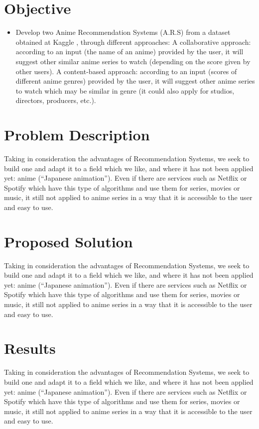 \documentclass[conference]{IEEEtran}
\begin{document}
\section{Objective}
\begin{itemize}
	\item Develop two Anime Recommendation Systems (A.R.S) from a dataset obtained at Kaggle \cite{b7}, through different approaches:
	\SubItem A collaborative approach: according to an input (the name of an anime) provided by the user, it will suggest other similar anime series to watch (depending on the score given by other users).
	\SubItem A content-based approach: according to an input (scores of different anime genres) provided by the user, it will suggest other anime series to watch which may be similar in genre (it could also apply for studios, directors, producers, etc.).
\end{itemize}

\section{Problem Description}

Taking in consideration the advantages of Recommendation Systems, we seek to build one and adapt it to a field which we like, and where it has not been applied yet: anime (“Japanese animation”). Even if there are services such as Netflix or Spotify which have this type of algorithms and use them for series, movies or music, it still not applied to anime series in a way that it is accessible to the user and easy to use.

\section{Proposed Solution}

Taking in consideration the advantages of Recommendation Systems, we seek to build one and adapt it to a field which we like, and where it has not been applied yet: anime (“Japanese animation”). Even if there are services such as Netflix or Spotify which have this type of algorithms and use them for series, movies or music, it still not applied to anime series in a way that it is accessible to the user and easy to use.

\section{Results}

Taking in consideration the advantages of Recommendation Systems, we seek to build one and adapt it to a field which we like, and where it has not been applied yet: anime (“Japanese animation”). Even if there are services such as Netflix or Spotify which have this type of algorithms and use them for series, movies or music, it still not applied to anime series in a way that it is accessible to the user and easy to use.
\end{document}
